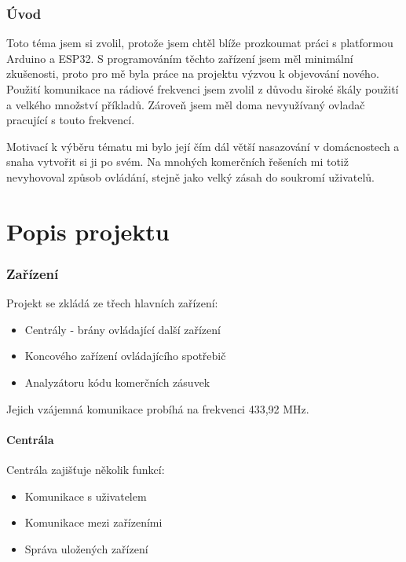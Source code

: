 \documentclass[a4paper,titlepage]{article}
\begin{document}
{\clearpage

\tableofcontents
\newpage

\section*{Úvod}

Toto téma jsem si zvolil, protože jsem chtěl blíže prozkoumat práci s platformou Arduino a ESP32. S programováním těchto zařízení jsem měl minimální zkušenosti, proto pro mě byla práce na projektu výzvou k objevování nového. Použití komunikace na rádiové frekvenci jsem zvolil z důvodu široké škály použití a velkého množství příkladů. Zároveň jsem měl doma nevyužívaný ovladač pracující s touto frekvencí.



Motivací k výběru tématu  mi bylo její čím dál větší nasazování v domácnostech a snaha vytvořit si ji po svém. Na mnohých komerčních řešeních mi totiž nevyhovoval způsob ovládání, stejně jako velký zásah do soukromí uživatelů.
\clearpage

\part{Popis projektu}

\section{Zařízení}

Projekt se zkládá ze třech hlavních zařízení:
\begin{itemize}
	\item Centrály - brány ovládající další zařízení
	\item Koncového zařízení ovládajícího spotřebič
	\item Analyzátoru kódu komerčních zásuvek
\end{itemize}

Jejich vzájemná komunikace probíhá na frekvenci 433,92 MHz. 

\subsection{Centrála}

Centrála zajišťuje několik funkcí:
\begin{itemize}
	\item Komunikace s uživatelem
	\item Komunikace mezi zařízeními
	\item Správa uložených zařízení
\end{itemize}

}
\end{document}
